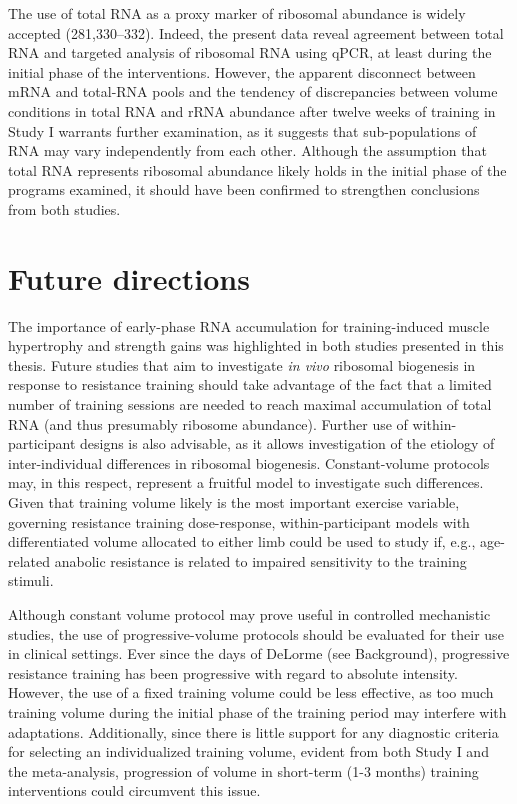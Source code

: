 \documentclass[twoside,10pt]{gihclass} %
\begin{document}
The use of total RNA as a proxy marker of ribosomal abundance is widely accepted
(281,330--332).
Indeed, the present data reveal agreement between total RNA and targeted analysis of ribosomal RNA using qPCR, at least during the initial phase of the interventions. However, the apparent disconnect between mRNA and total-RNA pools and the tendency of discrepancies between volume conditions in total RNA and rRNA abundance after twelve weeks of training in Study I warrants further examination, as it suggests that sub-populations of RNA may vary independently from each other. Although the assumption that total RNA represents ribosomal abundance likely holds in the initial phase of the programs examined, it should have been confirmed to strengthen conclusions from both studies.

\hypertarget{future-directions}{%
\section{Future directions}\label{future-directions}}

The importance of early-phase RNA accumulation for training-induced muscle hypertrophy and strength gains was highlighted in both studies presented in this thesis. Future studies that aim to investigate \emph{in vivo} ribosomal biogenesis in response to resistance training should take advantage of the fact that a limited number of training sessions are needed to reach maximal accumulation of total RNA (and thus presumably ribosome abundance). Further use of within-participant designs is also advisable, as it allows investigation of the etiology of inter-individual differences in ribosomal biogenesis. Constant-volume protocols may, in this respect, represent a fruitful model to investigate such differences. Given that training volume likely is the most important exercise variable, governing resistance training dose-response, within-participant models with differentiated volume allocated to either limb could be used to study if, e.g., age-related anabolic resistance is related to impaired sensitivity to the training stimuli.

Although constant volume protocol may prove useful in controlled mechanistic studies, the use of progressive-volume protocols should be evaluated for their use in clinical settings. Ever since the days of DeLorme (see Background), progressive resistance training has been progressive with regard to absolute intensity. However, the use of a fixed training volume could be less effective, as too much training volume during the initial phase of the training period may interfere with adaptations. Additionally, since there is little support for any diagnostic criteria for selecting an individualized training volume, evident from both Study I and the meta-analysis, progression of volume in short-term (1-3 months) training interventions could circumvent this issue.
\end{document}
